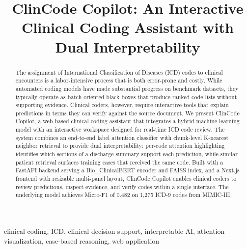 \documentclass[conference]{IEEEtran}
\begin{document}
\title{ClinCode Copilot: An Interactive Clinical Coding Assistant with Dual Interpretability}

\author{
\and
{}
\and
{}
\and
{}
}

\maketitle

\begin{abstract}
The assignment of International Classification of Diseases (ICD) codes to clinical encounters is a labor-intensive process that is both error-prone and costly. While automated coding models have made substantial progress on benchmark datasets, they typically operate as batch-oriented black boxes that produce ranked code lists without supporting evidence. Clinical coders, however, require interactive tools that explain predictions in terms they can verify against the source document. We present ClinCode Copilot, a web-based clinical coding assistant that integrates a hybrid machine learning model with an interactive workspace designed for real-time ICD code review. The system combines an end-to-end label attention classifier with chunk-level K-nearest neighbor retrieval to provide dual interpretability: per-code attention highlighting identifies which sections of a discharge summary support each prediction, while similar patient retrieval surfaces training cases that received the same code. Built with a FastAPI backend serving a Bio\_ClinicalBERT encoder and FAISS index, and a Next.js frontend with resizable multi-panel layout, ClinCode Copilot enables clinical coders to review predictions, inspect evidence, and verify codes within a single interface. The underlying model achieves Micro-F1 of 0.482 on 1,275 ICD-9 codes from MIMIC-III.
\end{abstract}

\begin{IEEEkeywords}
clinical coding, ICD, clinical decision support, interpretable AI, attention visualization, case-based reasoning, web application
\end{IEEEkeywords}
\end{document}

